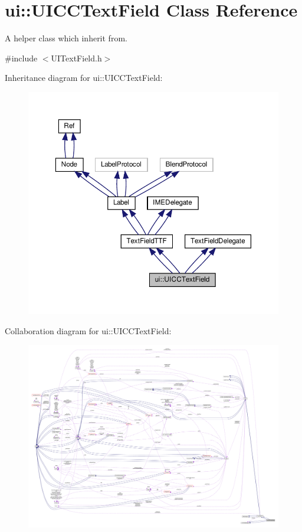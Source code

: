 \hypertarget{classui_1_1UICCTextField}{}\section{ui\+:\+:U\+I\+C\+C\+Text\+Field Class Reference}
\label{classui_1_1UICCTextField}


A helper class which inherit from.  




{\ttfamily \#include $<$U\+I\+Text\+Field.\+h$>$}



Inheritance diagram for ui\+:\+:U\+I\+C\+C\+Text\+Field\+:
\nopagebreak
\begin{figure}[H]
\begin{center}
\leavevmode
\includegraphics[width=350pt]{classui_1_1UICCTextField__inherit__graph}
\end{center}
\end{figure}


Collaboration diagram for ui\+:\+:U\+I\+C\+C\+Text\+Field\+:
\nopagebreak
\begin{figure}[H]
\begin{center}
\leavevmode
\includegraphics[width=350pt]{classui_1_1UICCTextField__coll__graph}
\end{center}
\end{figure}
